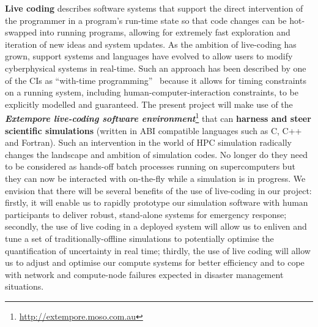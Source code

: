 \iffalse
When uncertainty is included into a model, the essential
dimensionality of the problem is increased markedly.  New and more
sophisticated techniques are then required to deal with the so called
`curse of dimensionality', where the cost of computation increases
exponentially with the dimension of the problem.  The mathematical
component of this project will be based on new developments combining
reduced order models (such as sparse grids and reduced basis methods)
with uncertainty quantification.  Sparse
grids~\parencite{BungartzGriebel2004} are known to reduce the effects
of the curse of dimensionality and recent work in our group has found
new ways to incorporate gradient information and multi-fidelity models
into sparse grid
approximations~\parencite{deBaarHarding2015,Jakeman2015,deBaarRDM2015}.
We will extend this work to construct efficient techniques for
incorporating uncertainty information into storm surge-tsunami models.
Reduced basis methods~\parencite{quarteroni2015reduced} provide an
alternative approach for constructing reduced order models and will
also be investigated.
\fi

{\bf Live coding} describes software systems that support the direct
intervention of the programmer in a program’s run-time state so that 
code changes can be 
hot-swapped into running programs, allowing for extremely fast
exploration and iteration of new ideas and system updates. As the
ambition of live-coding has grown, support systems and languages have
evolved to allow users to modify 
cyberphysical systems in real-time. Such an approach has been
described by one of the CIs as ``with-time
programming''~\parencite{sorensen2010programming} because it allows
for timing constraints on a running system, including
human-computer-interaction constraints, to be explicitly modelled and
guaranteed. The present project will make use of the {\em\bf Extempore
  live-coding software
  environment}\footnote{\url{http://extempore.moso.com.au}} that can
{\bf harness and steer scientific simulations} (written in ABI compatible
languages such as C, C++ and Fortran). Such an intervention in
the world of HPC simulation radically changes
the landscape and ambition of simulation codes. No longer do they need
to be considered as hands-off batch processes running on
supercomputers but they can now be interacted with on-the-fly while a
simulation is in progress. We envision that there will be several
benefits of the use of live-coding in our project: firstly, it
will enable us to {rapidly prototype our simulation software}  with human participants to
deliver robust, stand-alone systems for
 emergency response;  secondly, the use of live coding in a deployed system will allow us to 
{enliven and tune a set of traditionally-offline simulations to potentially optimise the 
quantification of uncertainty in real time}; thirdly, the use of live coding
will allow us to {adjust and optimise our compute systems for better efficiency} and to cope 
with network and compute-node failures expected in disaster management situations.

